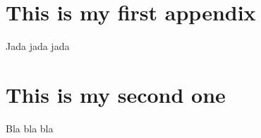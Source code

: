 \documentclass[
  12pt,
]{book}
\begin{document}
\hypertarget{appendix-appendix}{%
\appendix {}}


\hypertarget{this-is-my-first-appendix}{%
\chapter{This is my first appendix}\label{this-is-my-first-appendix}}

Jada jada jada

\hypertarget{this-is-my-second-one}{%
\chapter{This is my second one}\label{this-is-my-second-one}}

Bla bla bla
\end{document}
